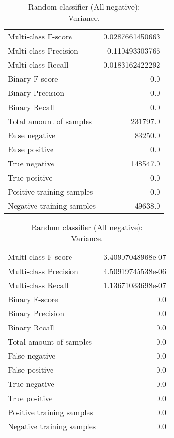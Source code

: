 \begin{table}[H]
\begin{minipage}{0.5\textwidth}
\caption{Random classifier (All negative): \\Average.}
\centering
\begin{tabular}{l r}
\toprule
Multi-class F-score & 0.0287661450663 \\
Multi-class Precision & 0.110493303766 \\
Multi-class Recall & 0.0183162422292 \\
\midrule
Binary F-score & 0.0 \\
Binary Precision & 0.0 \\
Binary Recall & 0.0 \\
\midrule
Total amount of samples & 231797.0 \\
False negative & 83250.0 \\
False positive & 0.0 \\
True negative & 148547.0 \\
True positive & 0.0 \\
\midrule
Positive training samples & 0.0 \\
Negative training samples & 49638.0 \\
\bottomrule
\end{tabular}
\end{minipage}
\hfillx
\begin{minipage}{0.5\textwidth}
\caption{Random classifier (All negative): \\Variance.}
\centering
\begin{tabular}{l r}
\toprule
Multi-class F-score & 3.40907048968e-07 \\
Multi-class Precision & 4.50919745538e-06 \\
Multi-class Recall & 1.13671033698e-07 \\
\midrule
Binary F-score & 0.0 \\
Binary Precision & 0.0 \\
Binary Recall & 0.0 \\
\midrule
Total amount of samples & 0.0 \\
False negative & 0.0 \\
False positive & 0.0 \\
True negative & 0.0 \\
True positive & 0.0 \\
\midrule
Positive training samples & 0.0 \\
Negative training samples & 0.0 \\
\bottomrule
\end{tabular}
\end{minipage}
\end{table}

